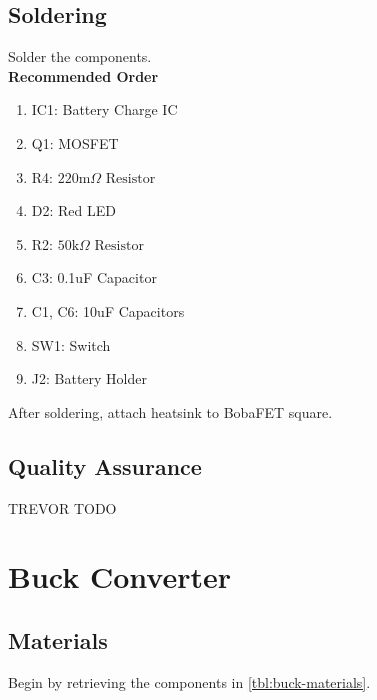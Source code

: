 \documentclass{article}
\newcommand{\resistor}[1]{$\text{#1} \Omega \text{ Resistor}$}
\begin{document}
\subsection{Soldering}

Solder the components. \\

\noindent \textbf{Recommended Order}

\begin{enumerate}
  \item IC1: Battery Charge IC
  \item Q1: MOSFET
  \item R4: \resistor{220m} 
  \item D2: Red LED
  \item R2: \resistor{50k}
  \item C3: 0.1uF Capacitor
  \item C1, C6: 10uF Capacitors 
  \item SW1: Switch
  \item J2: Battery Holder
\end{enumerate}

After soldering, attach heatsink to BobaFET square.

\subsection{Quality Assurance}

TREVOR TODO

\section{Buck Converter}

\subsection{Materials}
Begin by retrieving the components in \autoref{tbl:buck-materials}.
\end{document}
